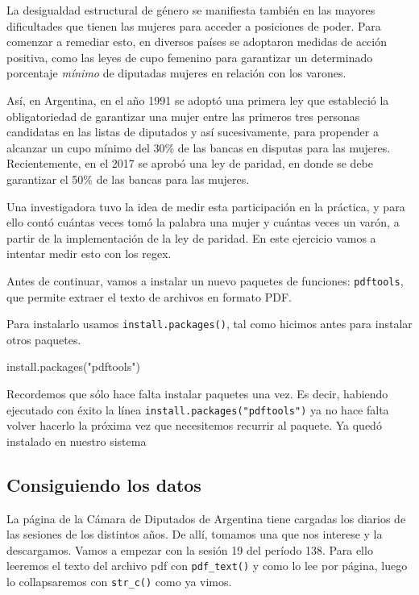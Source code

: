 \documentclass[
]{book}
\newenvironment{Shaded}{\begin{snugshade}}{\end{snugshade}}
\newcommand{\FunctionTok}[1]{\textcolor[rgb]{0.00,0.00,0.00}{#1}}
\newcommand{\NormalTok}[1]{#1}
\newcommand{\StringTok}[1]{\textcolor[rgb]{0.31,0.60,0.02}{#1}}
\begin{document}
La desigualdad estructural de género se manifiesta también en las mayores dificultades que tienen las mujeres para acceder a posiciones de poder. Para comenzar a remediar esto, en diversos países se adoptaron medidas de acción positiva, como las leyes de cupo femenino para garantizar un determinado porcentaje \emph{mínimo} de diputadas mujeres en relación con los varones.

Así, en Argentina, en el año 1991 se adoptó una primera ley que estableció la obligatoriedad de garantizar una mujer entre las primeros tres personas candidatas en las listas de diputados y así sucesivamente, para propender a alcanzar un cupo mínimo del 30\% de las bancas en disputas para las mujeres. Recientemente, en el 2017 se aprobó una ley de paridad, en donde se debe garantizar el 50\% de las bancas para las mujeres.

Una investigadora tuvo la idea de medir esta participación en la práctica, y para ello contó cuántas veces tomó la palabra una mujer y cuántas veces un varón, a partir de la implementación de la ley de paridad. En este ejercicio vamos a intentar medir esto con los regex.

Antes de continuar, vamos a instalar un nuevo paquetes de funciones: \texttt{pdftools}, que permite extraer el texto de archivos en formato PDF.

Para instalarlo usamos \texttt{install.packages()}, tal como hicimos antes para instalar otros paquetes.

\begin{Shaded}
\begin{Highlighting}[]
\FunctionTok{install.packages}\NormalTok{(}\StringTok{"pdftools"}\NormalTok{)}
\end{Highlighting}
\end{Shaded}

Recordemos que sólo hace falta instalar paquetes una vez. Es decir, habiendo ejecutado con éxito la línea \texttt{install.packages("pdftools")} ya no hace falta volver hacerlo la próxima vez que necesitemos recurrir al paquete. Ya quedó instalado en nuestro sistema

\hypertarget{consiguiendo-los-datos}{%
\subsection{Consiguiendo los datos}\label{consiguiendo-los-datos}}

La página de la Cámara de Diputados de Argentina tiene cargadas los diarios de las sesiones de los distintos años. De allí, tomamos una que nos interese y la descargamos. Vamos a empezar con la sesión 19 del período 138. Para ello leeremos el texto del archivo pdf con \texttt{pdf\_text()} y como lo lee por página, luego lo collapsaremos con \texttt{str\_c()} como ya vimos.
\end{document}

